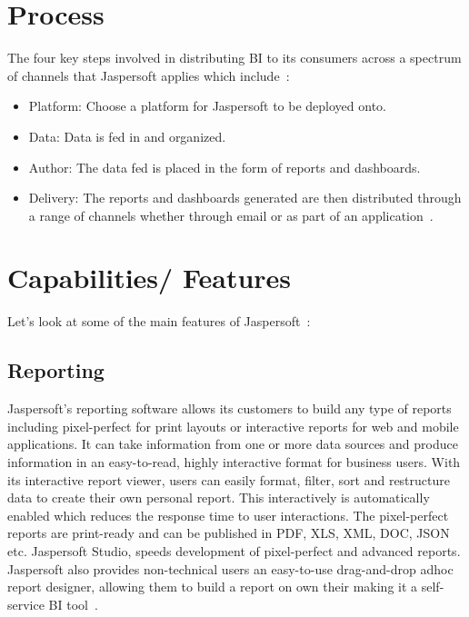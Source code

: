 \section{Process}
The four key steps involved in distributing BI to its consumers across a
spectrum of channels that Jaspersoft applies which include~\cite{hid-sp18-516-www-quick-start-video}:
\begin{itemize} \item Platform: Choose a platform for Jaspersoft to be deployed onto.
\item Data: Data is fed in and organized. 
\item Author: The data fed is placed in the form of reports and dashboards.
\item Delivery: The reports and dashboards generated are then distributed
through a range of channels whether through email or as part of an
application~\cite{hid-sp18-516-www-quick-start-video}. \end{itemize}


\section{Capabilities/ Features}
Let's look at some of the main features of
Jaspersoft~\cite{hid-sp18-516-www-jaspersoft-features}:

\subsection{Reporting}
Jaspersoft's reporting software allows its customers to build any type of
reports including pixel-perfect for print layouts or interactive reports for web
and mobile applications. It can take information from one or more data sources
and produce information in an easy-to-read, highly interactive format for
business users. With its interactive report viewer, users can easily format,
filter, sort and restructure data to create their own personal report. This
interactively is automatically enabled which reduces the response time to user
interactions. The pixel-perfect reports are print-ready and can be published in
PDF, XLS, XML, DOC, JSON etc. Jaspersoft Studio, speeds development of
pixel-perfect and advanced reports. Jaspersoft also provides non-technical users
an easy-to-use drag-and-drop adhoc report designer, allowing them to build a
report on own their making it a self-service BI
tool~\cite{hid-sp18-516-www-jaspersoft-reporting-software}. 

